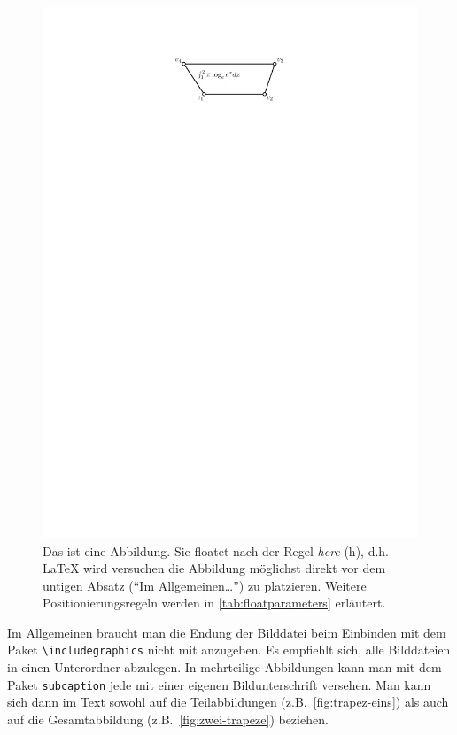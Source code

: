 \documentclass[bachelor,german]{algothesis}
\begin{document}
\begin{figure}[h] %
  \centering
  \includegraphics[page=3]{trapez}
  \caption{Das ist eine Abbildung. Sie floatet nach der Regel \emph{here} (h), d.h. \LaTeX{} wird versuchen die Abbildung möglichst direkt vor dem untigen Absatz ("`Im Allgemeinen\dots"') zu platzieren. Weitere Positionierungsregeln werden in \cref{tab:floatparameters} erläutert.} 
  \label{fig:trapez}
\end{figure}

Im Allgemeinen braucht man die Endung der Bilddatei beim Einbinden mit dem Paket \verb+\includegraphics+ nicht mit anzugeben.  
Es empfiehlt sich, alle Bilddateien in einen Unterordner abzulegen.  
In mehrteilige Abbildungen kann man mit dem Paket \verb+subcaption+ jede mit einer eigenen Bildunterschrift versehen.  
Man kann sich dann im Text sowohl auf die Teilabbildungen (z.B.\ \cref{fig:trapez-eins}) als auch auf die Gesamtabbildung (z.B.\ \cref{fig:zwei-trapeze}) beziehen.
\end{document}
